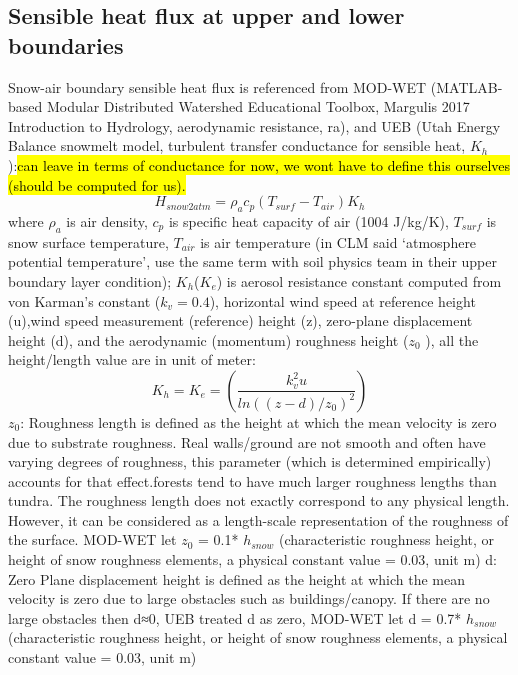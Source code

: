\documentclass{article}
\begin{document}
\subsection{Sensible heat flux at upper and lower boundaries}
Snow-air boundary sensible heat flux is referenced from MOD-WET (MATLAB-based Modular Distributed Watershed Educational Toolbox, Margulis 2017 Introduction to Hydrology, aerodynamic resistance, ra), and UEB (Utah Energy Balance snowmelt model, turbulent transfer conductance for sensible heat, $K_h$):\hl{can leave in terms of conductance for now, we wont have to define this ourselves (should be computed for us).}
\begin{equation}
H_{snow2atm}= \rho_a c_p (T_{surf}-T_{air})K_h
\end{equation}
where $\rho_a$ is air density, $c_p$ is specific heat capacity of air (1004 J/kg/K), $T_{surf}$ is snow surface temperature, $T_{air}$ is air temperature (in CLM said ‘atmosphere potential temperature’, use the same term with soil physics team in their upper boundary layer condition); $K_h$($K_e$) is aerosol resistance constant computed from von Karman's constant ($k_v=0.4$), horizontal wind speed at reference height (u),wind speed measurement (reference) height (z), zero-plane displacement height (d), and the aerodynamic (momentum) roughness height ($z_0$ ), all the height/length value are in unit of meter:
\begin{equation}
K_h = K_e =  (\frac{{k^2_vu}}{ln((z-d)/z_0)^2})
\end{equation}
$z_0$: Roughness length is defined as the height at which the mean velocity is zero due to substrate roughness. Real walls/ground are not smooth and often have varying degrees of roughness, this parameter (which is determined empirically) accounts for that effect.forests tend to have much larger roughness lengths than tundra. The roughness length does not exactly correspond to any physical length. However, it can be considered as a length-scale representation of the roughness of the surface. MOD-WET let $z_0$ = 0.1* $h_{snow}$ (characteristic roughness height, or height of snow roughness elements, a physical constant value = 0.03, unit m) 
d: Zero Plane displacement height is defined as the height at which the mean velocity is zero due to large obstacles such as buildings/canopy. If there are no large obstacles then d≈0, UEB treated d as zero, MOD-WET let d = 0.7* $h_{snow}$ (characteristic roughness height, or height of snow roughness elements, a physical constant value = 0.03, unit m) 
\end{document}
